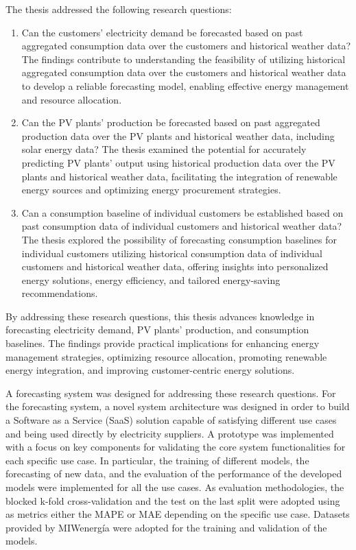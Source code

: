 The thesis addressed the following research questions:
\begin{enumerate}
  \item Can the customers' electricity demand be forecasted based on past aggregated consumption data over the customers and historical weather data? The findings contribute to understanding the feasibility of utilizing historical aggregated consumption data over the customers and historical weather data to develop a reliable forecasting model, enabling effective energy management and resource allocation.
  \item Can the PV plants' production be forecasted based on past aggregated production data over the PV plants and historical weather data, including solar energy data? The thesis examined the potential for accurately predicting PV plants' output using historical production data over the PV plants and historical weather data, facilitating the integration of renewable energy sources and optimizing energy procurement strategies.
  \item Can a consumption baseline of individual customers be established based on past consumption data of individual customers and historical weather data? The thesis explored the possibility of forecasting consumption baselines for individual customers utilizing historical consumption data of individual customers and historical weather data, offering insights into personalized energy solutions, energy efficiency, and tailored energy-saving recommendations.
\end{enumerate}
By addressing these research questions, this thesis advances knowledge in forecasting electricity demand, PV plants' production, and consumption baselines.
The findings provide practical implications for enhancing energy management strategies, optimizing resource allocation, promoting renewable energy integration, and improving customer-centric energy solutions.



A forecasting system was designed for addressing these research questions.
For the forecasting system, a novel system architecture was designed in order to build a Software as a Service (SaaS) solution capable of satisfying different use cases and being used directly by electricity suppliers.
A prototype was implemented with a focus on key components for validating the core system functionalities for each specific use case.
In particular, the training of different models, the forecasting of new data, and the evaluation of the performance of the developed models were implemented for all the use cases.
As evaluation methodologies, the blocked k-fold cross-validation and the test on the last split were adopted using as metrics either the MAPE or MAE depending on the specific use case.
Datasets provided by MIWenergía were adopted for the training and validation of the models.

